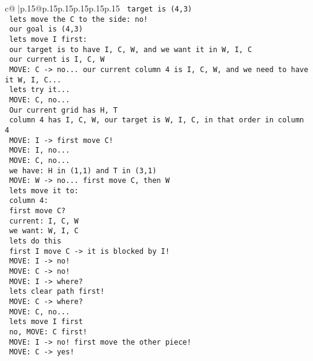 \documentclass{article}
\begin{document}
{\begin{supertabular}{c@{$\;$}|p{.15\linewidth}@{}p{.15\linewidth}p{.15\linewidth}p{.15\linewidth}p{.15\linewidth}p{.15\linewidth}}
{{{\texttt{ target is (4,3) } \\
\texttt{ lets move the C to the side: no!} \\
\texttt{ our goal is (4,3) } \\
\texttt{ lets move I first: } \\
\texttt{  our target is to have I, C, W, and we want it in W, I, C } \\
\texttt{ our current is I, C, W} \\
\texttt{ MOVE: C {-}> no... our current column 4 is I, C, W, and we need to have it W, I, C...} \\
\texttt{ lets try it...} \\
\texttt{ MOVE: C, no... } \\
\texttt{  Our current grid has H, T } \\
\texttt{ column 4 has I, C, W, our target is W, I, C, in that order in column 4 } \\
\texttt{ MOVE: I {-}> first move C!} \\
\texttt{ MOVE: I, no...} \\
\texttt{ MOVE: C, no...} \\
\texttt{ we have: H in (1,1) and T in (3,1) } \\
\texttt{ MOVE: W {-}> no... first move C, then W} \\
\texttt{ lets move it to: } \\
\texttt{ column 4: } \\
\texttt{ first move C?} \\
\texttt{ current: I, C, W } \\
\texttt{ we want: W, I, C } \\
\texttt{ lets do this } \\
\texttt{ first I move C {-}> it is blocked by I!} \\
\texttt{ MOVE: I {-}> no! } \\
\texttt{ MOVE: C {-}> no! } \\
\texttt{ MOVE: I {-}> where? } \\
\texttt{ lets clear path first!} \\
\texttt{ MOVE: C {-}> where? } \\
\texttt{ MOVE: C, no... } \\
\texttt{ lets move I first } \\
\texttt{ no, MOVE: C first!} \\
\texttt{ MOVE: I {-}> no! first move the other piece!} \\
\texttt{ MOVE: C {-}> yes!} \\
}}}
\end{supertabular}}
\end{document}
